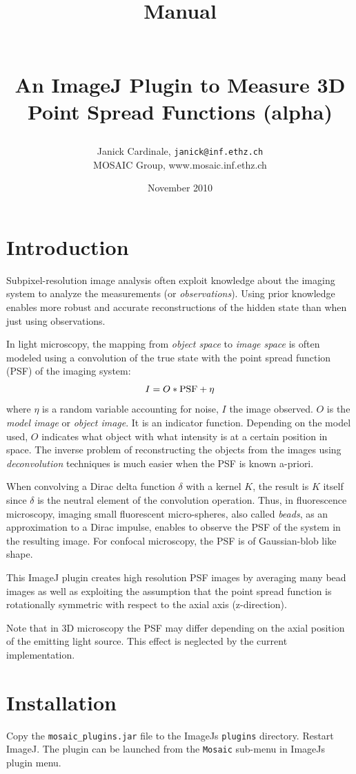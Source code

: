 \documentclass{scrartcl}
\title{\begin{small}Manual\end{small}\\An ImageJ Plugin to Measure 3D Point Spread Functions (alpha)}
\date{November 2010}
\author{Janick Cardinale, \texttt{janick@inf.ethz.ch}\\MOSAIC Group, www.mosaic.inf.ethz.ch}
\begin{document}
\maketitle

\section{Introduction}
\label{sec:intro}
Subpixel-resolution image analysis often exploit knowledge about the imaging system to analyze the measurements (or \textit{observations}). Using prior knowledge enables more robust and accurate reconstructions of the hidden state than when just using observations. 

In light microscopy, the mapping from \textit{object space} to \textit{image space} is often modeled using a convolution of the true state with the point spread function (PSF) of the imaging system:
\[   
I = O * \textnormal{PSF} + \eta
\] 
where $\eta$ is a random variable accounting for noise, $I$ the image observed. $O$ is the \textit{model image} or \textit{object image}. It is an indicator function. Depending on the model used, $O$ indicates what object with what intensity is at a certain position in space.  The inverse problem of reconstructing the objects from the images using \textit{deconvolution} techniques is much easier when the PSF is known a-priori. 

When convolving a Dirac delta function $\delta$ with a kernel $K$, the result is $K$ itself since $\delta$ is the neutral element of the convolution operation. Thus, in fluorescence microscopy, imaging small fluorescent micro-spheres, also called \textit{beads}, as an approximation to a Dirac impulse, enables to observe the PSF of the system in the resulting image. For confocal microscopy, the PSF is of Gaussian-blob like shape.

This ImageJ plugin creates high resolution PSF images by averaging many bead images as well as exploiting the assumption that the point spread function is rotationally symmetric with respect to the axial axis (z-direction).

Note that in 3D microscopy the PSF may differ depending on the axial position of the emitting light source. This effect is neglected by the current implementation.

\section{Installation}
Copy the \texttt{mosaic\_plugins.jar} file to the ImageJs \texttt{plugins} directory. Restart ImageJ. The plugin can be launched from the \texttt{Mosaic} sub-menu in ImageJs plugin menu. 
\end{document}
